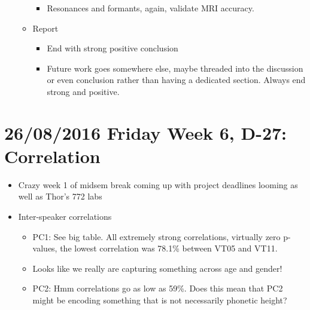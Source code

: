 \documentclass{article}
\begin{document}
\begin{itemize}
\begin{itemize}
\begin{itemize}
            \item Resonances and formants, again, validate MRI accuracy. 
        \end{itemize}
        \item Report
        \begin{itemize}
            \item End with strong positive conclusion
            \item Future work goes somewhere else, maybe threaded into the discussion or even conclusion rather than having a dedicated section. Always end strong and positive.
        \end{itemize}
    \end{itemize}
\end{itemize}

\section*{26/08/2016 Friday Week 6, D-27: Correlation}
\begin{itemize}
    \item Crazy week 1 of midsem break coming up with project deadlines looming as well as Thor's 772 labs
    \item Inter-speaker correlations
    \begin{itemize}
        \item PC1: See big table. All extremely strong correlations, virtually zero p-values, the lowest correlation was 78.1\% between VT05 and VT11.
        \item Looks like we really are capturing something across age and gender!
        \item PC2: Hmm correlations go as low as 59\%. Does this mean that PC2 might be encoding something that is not necessarily phonetic height?
    \end{itemize}
\end{itemize}
\end{document}
